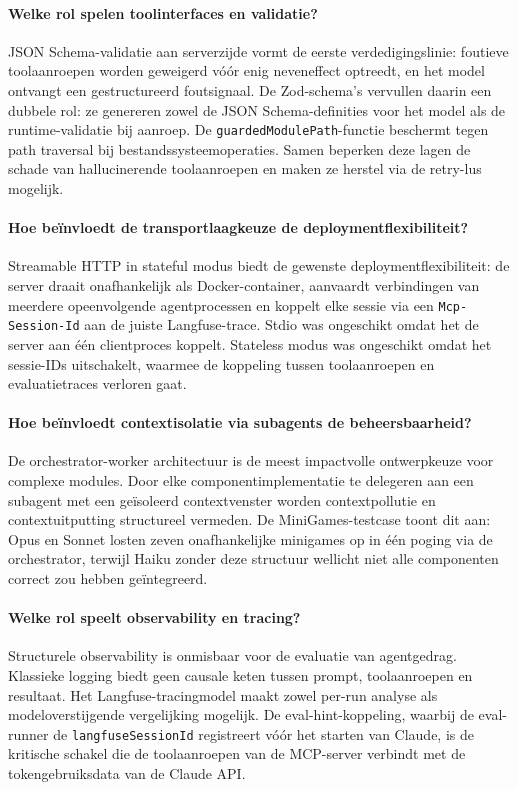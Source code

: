 \paragraph{Welke rol spelen toolinterfaces en validatie?}
JSON Schema-validatie aan serverzijde vormt de eerste verdedigingslinie: foutieve toolaanroepen worden geweigerd vóór enig neveneffect optreedt, en het model ontvangt een gestructureerd foutsignaal. De Zod-schema's vervullen daarin een dubbele rol: ze genereren zowel de JSON Schema-definities voor het model als de runtime-validatie bij aanroep. De \texttt{guardedModulePath}-functie beschermt tegen path traversal bij bestandssysteemoperaties. Samen beperken deze lagen de schade van hallucinerende toolaanroepen en maken ze herstel via de retry-lus mogelijk.

\paragraph{Hoe beïnvloedt de transportlaagkeuze de deploymentflexibiliteit?}
Streamable HTTP in stateful modus biedt de gewenste deploymentflexibiliteit: de server draait onafhankelijk als Docker-container, aanvaardt verbindingen van meerdere opeenvolgende agentprocessen en koppelt elke sessie via een \texttt{Mcp-Session-Id} aan de juiste Langfuse-trace. Stdio was ongeschikt omdat het de server aan één clientproces koppelt. Stateless modus was ongeschikt omdat het sessie-IDs uitschakelt, waarmee de koppeling tussen toolaanroepen en evaluatietraces verloren gaat.

\paragraph{Hoe beïnvloedt contextisolatie via subagents de beheersbaarheid?}
De orchestrator-worker architectuur is de meest impactvolle ontwerpkeuze voor complexe modules. Door elke componentimplementatie te delegeren aan een subagent met een geïsoleerd contextvenster worden contextpollutie en contextuitputting structureel vermeden. De MiniGames-testcase toont dit aan: Opus en Sonnet losten zeven onafhankelijke minigames op in één poging via de orchestrator, terwijl Haiku zonder deze structuur wellicht niet alle componenten correct zou hebben geïntegreerd.

\paragraph{Welke rol speelt observability en tracing?}
Structurele observability is onmisbaar voor de evaluatie van agentgedrag. Klassieke logging biedt geen causale keten tussen prompt, toolaanroepen en resultaat. Het Langfuse-tracingmodel maakt zowel per-run analyse als modeloverstijgende vergelijking mogelijk. De eval-hint-koppeling, waarbij de eval-runner de \texttt{langfuseSessionId} registreert vóór het starten van Claude, is de kritische schakel die de toolaanroepen van de MCP-server verbindt met de tokengebruiksdata van de Claude API.

